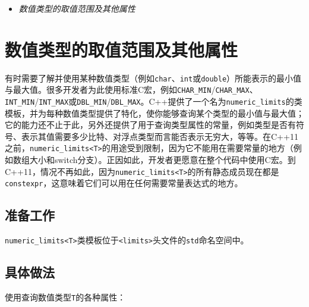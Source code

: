 
\begin{itemize}
\item \textit{数值类型的取值范围及其他属性}

\end{itemize}



\section{数值类型的取值范围及其他属性}



有时需要了解并使用某种数值类型（例如\texttt{char}、\texttt{int}或\texttt{double}）所能表示的最小值与最大值。很多开发者为此使用标准C宏，例如\texttt{CHAR\_\allowbreak{}MIN}/\texttt{CHAR\_\allowbreak{}MAX}、\texttt{INT\_\allowbreak{}MIN}/\texttt{INT\_\allowbreak{}MAX}或\texttt{DBL\_\allowbreak{}MIN}/\texttt{DBL\_\allowbreak{}MAX}。C++提供了一个名为\texttt{numeric\_\allowbreak{}limits}的类模板，并为每种数值类型提供了特化，使你能够查询某个类型的最小值与最大值；它的能力还不止于此，另外还提供了用于查询类型属性的常量，例如类型是否有符号、表示其值需要多少比特、对浮点类型而言能否表示无穷大，等等。在C++11之前，\texttt{numeric\_\allowbreak{}limits<\allowbreak{}T>}的用途受到限制，因为它不能用在需要常量的地方（例如数组大小和switch分支）。正因如此，开发者更愿意在整个代码中使用C宏。到C++11，情况不再如此，因为\texttt{numeric\_\allowbreak{}limits<\allowbreak{}T>}的所有静态成员现在都是\texttt{constexpr}，这意味着它们可以用在任何需要常量表达式的地方。



\subsection{准备工作}



\texttt{numeric\_\allowbreak{}limits<\allowbreak{}T>}类模板位于\texttt{<\allowbreak{}limits>}头文件的\texttt{std}命名空间中。



\subsection{具体做法}



使用查询数值类型\texttt{T}的各种属性：



